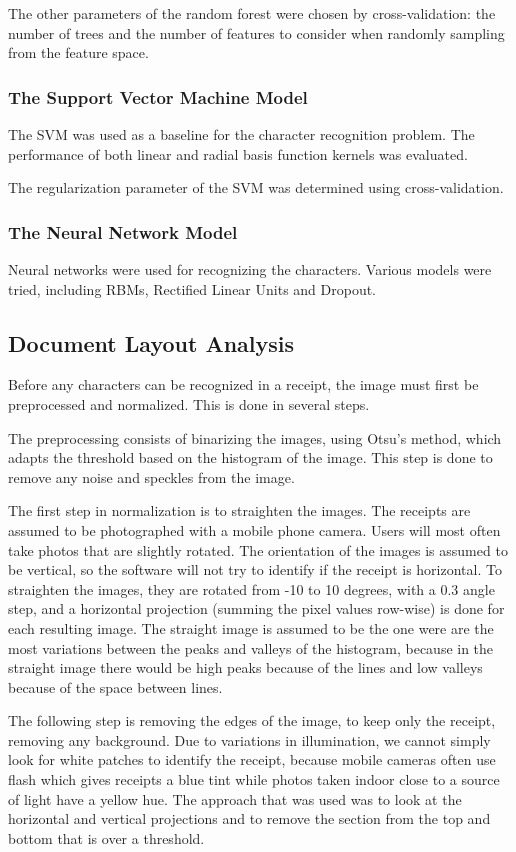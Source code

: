 The other parameters of the random forest were chosen by cross-validation: the number of trees and the number of features to consider when randomly sampling from the feature space. 

\subsubsection{The Support Vector Machine Model}
The SVM was used as a baseline for the character recognition problem. The performance of both linear and radial basis function kernels was evaluated. 

The regularization parameter of the SVM was determined using cross-validation. 

\subsubsection{The Neural Network Model}
Neural networks were used for recognizing the characters. Various models were tried, including RBMs, Rectified Linear Units and Dropout. 


\subsection{Document Layout Analysis}
Before any characters can be recognized in a receipt, the image must first be preprocessed and normalized. This is done in several steps. 

The preprocessing consists of binarizing the images, using Otsu's method\cite{otsu1975threshold}, which adapts the threshold based on the histogram of the image. This step is done to remove any noise and speckles from the image. 

The first step in normalization is to straighten the images. The receipts are assumed to be photographed with a mobile phone camera. Users will most often take photos that are slightly rotated. The orientation of the images is assumed to be vertical, so the software will not try to identify if the receipt is horizontal. To straighten the images, they are rotated from -10 to 10 degrees, with a 0.3 angle step, and a horizontal projection (summing the pixel values row-wise) is done for each resulting image. The straight image is assumed to be the one were are the most variations between the peaks and valleys of the histogram, because in the straight image there would be high peaks because of the lines and low valleys because of the space between lines. 

The following step is removing the edges of the image, to keep only the receipt, removing any background. Due to variations in illumination, we cannot simply look for white patches to identify the receipt, because mobile cameras often use flash which gives receipts a blue tint while photos taken indoor close to a source of light have a yellow hue. The approach that was used was to look at the horizontal and vertical projections and to remove the section from the top and bottom that is over a threshold. 

